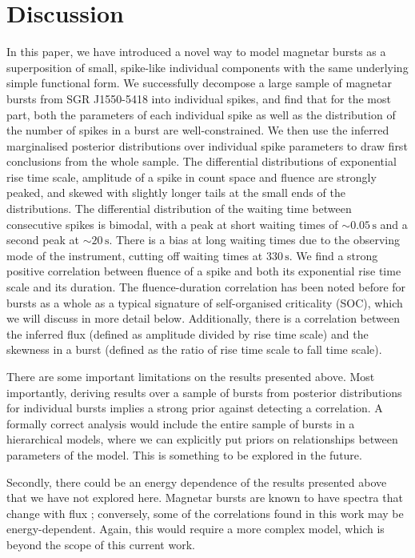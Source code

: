 \documentclass[12pt]{emulateapj}
\begin{document}
\section{Discussion}
\label{ch6:discussion}

In this paper, we have introduced a novel way to model magnetar bursts as a superposition of small, spike-like individual components with the same
underlying simple functional form. We successfully decompose a large sample of magnetar bursts from SGR J1550-5418 into individual spikes, and 
find that for the most part, both the parameters of each individual spike as well as the distribution of the number of spikes in a burst are well-constrained.
We then use the inferred marginalised posterior distributions over individual spike parameters to draw first conclusions from the whole sample. 
The differential distributions of exponential rise time scale, amplitude of a spike in count space and fluence are strongly peaked, and skewed with slightly longer
tails at the small ends of the distributions. The differential distribution of the waiting time between consecutive spikes is bimodal, with a peak at short waiting times
of $\sim\!\!0.05\,\mathrm{s}$ and a second peak at $\sim\!\! 20\,\mathrm{s}$. There is a bias at long waiting times due to the observing mode of the instrument, cutting off
waiting times at $330\,\mathrm{s}$. 
We find a strong positive correlation between fluence of a spike and both its exponential rise time scale and its duration. The fluence-duration correlation has been noted
before for bursts as a whole \citep{gogus1999,gogus2000,vanderhorst2012} as a typical signature of self-organised criticality (SOC), which we will discuss in more 
detail below. 
Additionally, there is a correlation between
the inferred flux (defined as amplitude divided by rise time scale) and the skewness in a burst (defined as the ratio of rise time scale to fall time scale). 

There are some important limitations on the results presented above. Most importantly, deriving results over a sample of bursts from posterior distributions for individual bursts
implies a strong prior against detecting a correlation. A formally correct analysis would include the entire sample of bursts in a hierarchical models, where we can explicitly put
priors on relationships between parameters of the model. This is something to be explored in the future.

Secondly, there could be an energy dependence of the results presented above that we have not explored here. Magnetar bursts are known to have spectra that change with flux 
\citep[e.g.\ ][]{younes2013}; conversely, some of the correlations found in this work may be energy-dependent. Again, this would require a more complex model, which is beyond the 
scope of this current work.
\end{document}

